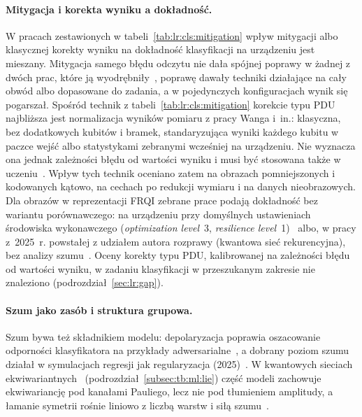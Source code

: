 \paragraph{Mitygacja i korekta wyniku a dokładność.}
W pracach zestawionych w tabeli~\ref{tab:lr:cls:mitigation} wpływ mitygacji albo klasycznej korekty wyniku na dokładność klasyfikacji na urządzeniu jest mieszany.
Mitygacja samego błędu odczytu nie dała spójnej poprawy w żadnej z dwóch prac, które ją wyodrębniły~\cite{peters_machine_2021,singh_benchmarking_2026}, poprawę dawały techniki działające na cały obwód albo dopasowane do zadania, a w pojedynczych konfiguracjach wynik się pogarszał.
Spośród technik z tabeli~\ref{tab:lr:cls:mitigation} korekcie typu PDU najbliższa jest normalizacja wyników pomiaru z pracy Wanga i~in.: klasyczna, bez dodatkowych kubitów i bramek, standaryzująca wyniki każdego kubitu w paczce wejść albo statystykami zebranymi wcześniej na urządzeniu.
Nie wyznacza ona jednak zależności błędu od wartości wyniku i musi być stosowana także w uczeniu~\cite{wang_quantumnat_2022}.
Wpływ tych technik oceniano zatem na obrazach pomniejszonych i kodowanych kątowo, na cechach po redukcji wymiaru i na danych nieobrazowych.
Dla obrazów w reprezentacji FRQI zebrane prace podają dokładność bez wariantu porównawczego: na urządzeniu przy domyślnych ustawieniach środowiska wykonawczego (\emph{optimization level}~3, \emph{resilience level}~1)~\cite{shen_classification_2024} albo, w pracy z~2025~r. powstałej z udziałem autora rozprawy (kwantowa sieć rekurencyjna), bez analizy szumu~\cite{potempa_frqi_pairs_2025}.
Oceny korekty typu PDU, kalibrowanej na zależności błędu od wartości wyniku, w zadaniu klasyfikacji w przeszukanym zakresie nie znaleziono (podrozdział~\ref{sec:lr:gap}).

\paragraph{Szum jako zasób i struktura grupowa.}
Szum bywa też składnikiem modelu: depolaryzacja poprawia oszacowanie odporności klasyfikatora na przykłady adwersarialne~\cite{du_quantum_2021}, a dobrany poziom szumu działał w symulacjach regresji jak regularyzacja (2025)~\cite{kuzmin_method_2025}.
W kwantowych sieciach ekwiwariantnych~\cite{nguyen2024_eqnn} (podrozdział~\ref{subsec:tb:ml:lie}) część modeli zachowuje ekwiwariancję pod kanałami Pauliego, lecz nie pod tłumieniem amplitudy, a łamanie symetrii rośnie liniowo z liczbą warstw i siłą szumu~\cite{tuysuz_symmetry_2024}.

